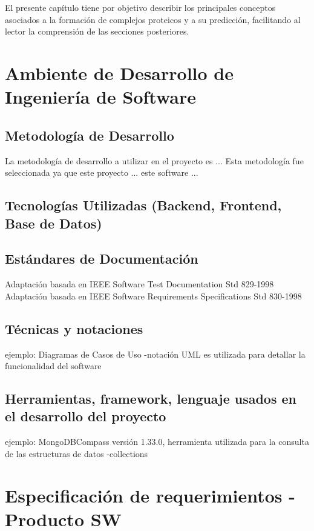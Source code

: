 
El presente capítulo tiene por objetivo describir los principales conceptos asociados a la formación de complejos proteicos y a su predicción, facilitando al lector la comprensión de las secciones posteriores.


\section{Ambiente de Desarrollo de Ingeniería de Software}
\subsection{Metodología de Desarrollo}

La metodología de desarrollo a utilizar en el proyecto es ... 
Esta metodología fue seleccionada ya que este proyecto ...
este software ...

\subsection{Tecnologías Utilizadas (Backend, Frontend, Base de Datos)}



\subsection{Estándares de Documentación}

Adaptación basada en IEEE Software Test Documentation Std 829-1998 
Adaptación basada en IEEE Software Requirements Specifications Std 830-1998

\subsection{Técnicas y notaciones}

ejemplo: Diagramas de Casos de Uso -notación UML es utilizada para detallar la funcionalidad del software 

\subsection{Herramientas, framework, lenguaje usados en el desarrollo del proyecto}

ejemplo: MongoDBCompass versión 1.33.0, herramienta utilizada para la consulta de las estructuras de datos -collections

\section{Especificación de requerimientos - Producto SW}
